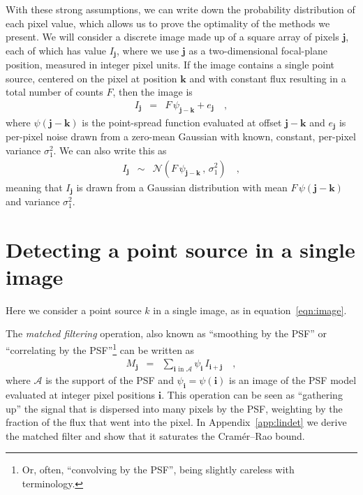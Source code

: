 \documentclass[letterpaper,preprint]{aastex62}
\newcommand{\equationname}{equation}
\newcommand{\eqnref}[1]{\mbox{\equationname~\ref{#1}}}
\newcommand{\appref}[1]{\mbox{Appendix~\ref{#1}}}
\newcommand{\drawnfrom}{\sim}
\newcommand{\gaussianN}{\mathcal{N}}
\newcommand{\gaussx}[2]{\gaussianN\!\left(#1 \, , \, #2\right)}
\newcommand{\psf}{\psi}
\newcommand{\psfat}[1]{\psf_{#1}}
\newcommand{\noise}{e}
\renewcommand{\vec}[1]{\boldsymbol{#1}}
\newcommand{\ivec}{\vec{i}}
\newcommand{\jvec}{\vec{j}}
\newcommand{\kvec}{\vec{k}}
\newcommand{\iina}{\ivec \,\, \mathrm{in} \,\, \mathcal{A}}
\begin{document}
With these strong assumptions, we can write down the probability
distribution of each pixel value, which allows us to prove the
optimality of the methods we present.
%
We will consider a discrete image made up of a square array of pixels
$\jvec$, each of which has value $I_{\jvec}$, where we
use $\jvec$ as a two-dimensional focal-plane position, measured in
integer pixel units.
%
If the image contains a single point source, centered on
the pixel at position $\kvec$ and with constant flux resulting in a
total number of counts $F$, then the image is
\begin{eqnarray}
  I_{\jvec} &=& F \, \psfat{\jvec - \kvec} + \noise_{\jvec} \quad ,
  \label{eqn:image}
\end{eqnarray}
where $\psi(\jvec-\kvec)$ is the point-spread function evaluated at
offset $\jvec-\kvec$ and $\noise_{\jvec}$ is per-pixel noise drawn
from a zero-mean Gaussian with known, constant, per-pixel variance $\sigma_1^2$.
%
We can also write this as
\begin{eqnarray}
  I_{\jvec} &\drawnfrom& \gaussx{F \, \psfat{\jvec - \kvec}}{\sigma_1^2}
  \nonumber
  \quad ,
\end{eqnarray}
meaning that $I_{\jvec}$ is drawn from a Gaussian distribution with
mean $F\, \psf(\jvec - \kvec)$ and variance $\sigma_1^2$.


\section{Detecting a point source in a single image}
\label{sec:detection}


Here we consider a point source $k$ in a single image, as in
\eqnref{eqn:image}.


The \emph{matched filtering} operation, also known as ``smoothing by
the PSF'' or ``correlating by the PSF''\footnote{
  Or, often, ``convolving by the PSF'', being slightly careless with terminology.}
can be written as
\begin{eqnarray}
  M_{\jvec} &=& \sum_{\iina} \psfat{\ivec} \, I_{\ivec + \jvec} \quad ,
\end{eqnarray}
where $\mathcal{A}$ is the support of the PSF and $\psfat{\ivec} =
\psf(\ivec)$ is an image of the PSF model evaluated at integer pixel
positions $\ivec$.  This operation can be seen as ``gathering up'' the
signal that is dispersed into many pixels by the PSF, weighting by the
fraction of the flux that went into the pixel.  In
\appref{app:lindet} we derive the matched filter and show that it
saturates the Cram\'er--Rao bound.
\end{document}
